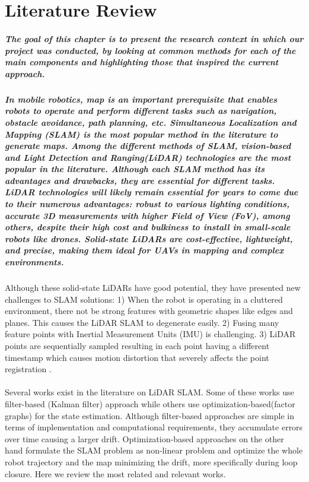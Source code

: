 \chapter{Literature Review}
\label{ch:review}

\paragraph{\textnormal{The goal of this chapter is to present the research context in which our project was conducted, by looking at common methods for each of the main components and highlighting those that inspired the current approach.}}

\paragraph{\textnormal{In mobile robotics, map is an important prerequisite that enables robots to operate and perform different tasks such as navigation, obstacle avoidance, path planning, etc. Simultaneous Localization and Mapping (SLAM) is the most popular method in the literature to generate maps. Among the different methods of SLAM, vision-based and Light Detection and Ranging(LiDAR) technologies are the most popular in the literature. Although each SLAM method has its advantages and drawbacks, they are essential for different tasks. LiDAR technologies will likely remain essential for years to come due to their numerous advantages: robust to various lighting conditions, accurate 3D measurements with higher Field of View (FoV), among others, despite their high cost and bulkiness to install in small-scale robots like drones. Solid-state LiDARs are cost-effective, lightweight, and precise, making them ideal for UAVs in mapping and complex environments. }}

Although these solid-state LiDARs have good potential, they have presented new challenges to SLAM solutions: 1) When the robot is operating in a cluttered environment, there not be strong features with geometric shapes like edges and planes. This causes the LiDAR SLAM to degenerate easily. 2) Fusing many feature points with Inertial Measurement Units (IMU) is challenging. 3) LiDAR points are sequentially sampled resulting in each point having a different timestamp which causes motion distortion that severely affects the point registration \cite{xu2021fastlio}.
\\ \\
Several works exist in the literature on LiDAR SLAM. Some of these works use filter-based (Kalman filter) approach while others use optimization-based(factor graphs) for the state estimation. Although filter-based approaches are simple in terms of implementation and computational requirements, they accumulate errors over time causing a larger drift. Optimization-based approaches on the other hand formulate the SLAM problem as non-linear problem and optimize the whole robot trajectory and the map minimizing the drift, more specifically during loop closure. Here we review the most related and relevant works.
